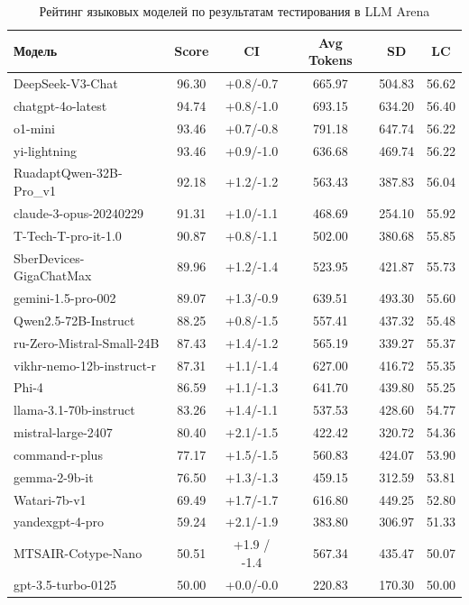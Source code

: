 \begin{table}[H]
	\caption{Рейтинг языковых моделей по результатам тестирования в LLM Arena}
	\label{tab:llm-comparison}
	\begin{tabular}{|l|c|c|c|c|c|}
		\hline
		\textbf{Модель} & \textbf{Score} & \textbf{CI} & \textbf{Avg Tokens} & \textbf{SD} & \textbf{LC} \\
		\hline
		DeepSeek-V3-Chat & 96.30 & +0.8/-0.7 & 665.97 & 504.83 & 56.62 \\
		chatgpt-4o-latest & 94.74 & +0.8/-1.0 & 693.15 & 634.20 & 56.40 \\
		o1-mini & 93.46 & +0.7/-0.8 & 791.18 & 647.74 & 56.22 \\
		yi-lightning & 93.46 & +0.9/-1.0 & 636.68 & 469.74 & 56.22 \\
		RuadaptQwen-32B-Pro\_v1 & 92.18 & +1.2/-1.2 & 563.43 & 387.83 & 56.04 \\
		claude-3-opus-20240229 & 91.31 & +1.0/-1.1 & 468.69 & 254.10 & 55.92 \\
		T-Tech-T-pro-it-1.0 & 90.87 & +0.8/-1.1 & 502.00 & 380.68 & 55.85 \\
		SberDevices-GigaChatMax & 89.96 & +1.2/-1.4 & 523.95 & 421.87 & 55.73 \\
		gemini-1.5-pro-002 & 89.07 & +1.3/-0.9 & 639.51 & 493.30 & 55.60 \\
		Qwen2.5-72B-Instruct & 88.25 & +0.8/-1.5 & 557.41 & 437.32 & 55.48 \\
		ru-Zero-Mistral-Small-24B & 87.43 & +1.4/-1.2 & 565.19 & 339.27 & 55.37 \\
		vikhr-nemo-12b-instruct-r & 87.31 & +1.1/-1.4 & 627.00 & 416.72 & 55.35 \\
		Phi-4 & 86.59 & +1.1/-1.3 & 641.70 & 439.80 & 55.25 \\
		llama-3.1-70b-instruct & 83.26 & +1.4/-1.1 & 537.53 & 428.60 & 54.77 \\
		mistral-large-2407 & 80.40 & +2.1/-1.5 & 422.42 & 320.72 & 54.36 \\
		command-r-plus & 77.17 & +1.5/-1.5 & 560.83 & 424.07 & 53.90 \\
		gemma-2-9b-it & 76.50 & +1.3/-1.3 & 459.15 & 312.59 & 53.81 \\
		Watari-7b-v1 & 69.49 & +1.7/-1.7 & 616.80 & 449.25 & 52.80 \\
		yandexgpt-4-pro & 59.24 & +2.1/-1.9 & 383.80 & 306.97 & 51.33 \\
		MTSAIR-Cotype-Nano & 50.51 & +1.9 / -1.4 & 567.34 & 435.47 & 50.07 \\
		gpt-3.5-turbo-0125 & 50.00 & +0.0/-0.0 & 220.83 & 170.30 & 50.00 \\

\end{tabular}
\end{table}
